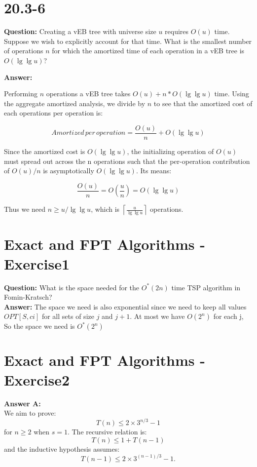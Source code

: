 \documentclass[12pt]{article}
\begin{document}
\section{20.3-6}
\textbf{Question: } 
Creating a vEB tree with universe size $u$ requires $O(u)$ time. Suppose we wish to explicitly account for that time. What is the smallest number of operations $n$ for which the amortized time of each operation in a vEB tree is $O(\lg\lg u)$?

\textbf{Answer:}

Performing $n$ operations a vEB tree takes $O(u) + n*O(\lg\lg u)$ time. Using the aggregate amortized analysis, we divide by $n$ to see that the amortized cost of each operations  per operation is:

\begin{equation}
Amortized \, per \, operation = \frac{O(u)}{n} + O(\lg\lg u) 
\end{equation} 

Since the amortized cost is $O(\lg \lg u)$, the initializing operation of $O(u)$ must spread out across  the n operations such that the per-operation contribution of $O(u)/n$ is asymptotically $O(\lg \lg u)$. Its means:

\begin{equation}
\frac{O(u)}{n}=O(\frac{u}{n}) = O( \lg \lg u)
\end{equation}

Thus we need $n \ge u/ \lg \lg u$, which is $\displaystyle \left \lceil \frac{u}{\lg\lg u} \right \rceil$ operations.


\section{Exact and FPT Algorithms - Exercise1}
\textbf{Question:} What is the space needed for the \(O^*(2n)\) time TSP algorithm in Fomin-Kratsch?\\
\textbf{Answer:} The space we need is also exponential since we need to keep all values \(OPT[S,ci]\) for all sets of size \(j\) and \(j+1\). At most we have \(O(2^n)\) for each j, So the space we need is \(O^*(2^n)\)


\section{Exact and FPT Algorithms - Exercise2}
\textbf{Answer A: }\\
We aim to prove:
\[
T(n) \leq 2 \times 3^{n/3} - 1
\]
for \( n \geq 2 \) when \( s = 1 \). The recursive relation is:
\[
T(n) \leq 1 + T(n-1)
\]
and the inductive hypothesis assumes:
\[
T(n-1) \leq 2 \times 3^{(n-1)/3} - 1.
\]
\end{document}
